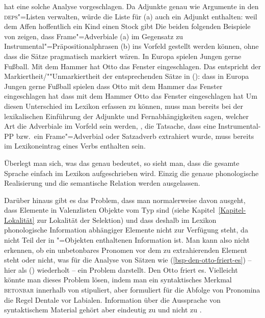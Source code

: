 \zl
\citet{Uszkoreit86b} hat eine solche Analyse vorgeschlagen.
Da \citet*{BMS2001a} Adjunkte genau wie Argumente in den \textsc{deps}"=Listen verwalten, würde die Liste
für (a) auch ein Adjunkt enthalten:
\eal
\ex weil dem Affen hoffentlich ein Kind einen Stock gibt
\ex {}
\zl
Die beiden folgenden Beispiele von \citet[]{Frey2004a} zeigen, dass
Frame"=Adverbiale (a) im Gegensatz zu Instrumental"=Präpositionalphrasen (b) ins
Vorfeld gestellt werden können, ohne dass die Sätze pragmatisch markiert wären.
\eal
\ex In Europa spielen Jungen gerne Fußball. 
\ex Mit dem Hammer hat Otto das Fenster eingeschlagen.
\zl
Das entspricht der Markiertheit/""Unmarkiertheit der entsprechenden Sätze in ():
\eal
\ex dass in Europa Jungen gerne Fußball spielen
\ex dass Otto mit dem Hammer das Fenster eingeschlagen hat
\ex dass mit dem Hammer Otto das Fenster eingeschlagen hat
\zl
Um diesen Unterschied im Lexikon erfassen zu können, muss man bereits bei der lexikalischen
Einführung der Adjunkte und Fernabhängigkeiten sagen, welcher Art die Adverbiale im Vorfeld
sein werden, \dash, die Tatsache, dass eine Instrumental-PP bzw.\ ein Frame"=Adverbial oder Satzadverb
extrahiert wurde, muss bereits im Lexikoneintrag eines Verbs enthalten sein.

Überlegt man sich, was das genau bedeutet, so sieht man, dass die gesamte Sprache einfach im Lexikon
aufgeschrieben wird. Einzig die genaue phonologische Realisierung und die semantische Relation
werden ausgelassen. 

Darüber hinaus gibt es das Problem, dass man normalerweise davon ausgeht, dass Elemente in Valenzlisten
Objekte vom Typ  sind (siehe Kapitel~\ref{Kapitel-Lokalität} zur Lokalität der Selektion)
und dass deshalb im Lexikon phonologische Information abhängiger Elemente nicht zur Verfügung steht,
da \phon nicht Teil der in "=Objekten enthaltenen Information ist. Man kann also nicht
erkennen, ob ein unbetonbares Pronomen vor dem zu extrahierenden Element steht oder nicht, was für
die Analyse von Sätzen wie (\ref{bsp-den-otto-friert-es}) -- hier als () wiederholt -- ein
Problem darstellt. 
\ea
\label{bsp-den-otto-friert-es-zwei}
Den Otto friert es.
\z
Vielleicht könnte man dieses Problem lösen, indem man ein syntaktisches Merkmal \textsc{betonbar}
innerhalb von \synsem stipuliert, aber \citet[]{Abraham95a-u} formuliert für die Abfolge
von Pronomina die Regel Dentale vor Labialen. Information über die Aussprache von syntaktischem
Material gehört aber eindeutig zu \phon und nicht zu \synsem.
%
%
%
%



